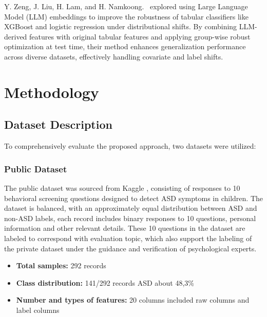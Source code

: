 \documentclass[conference]{IEEEtran}
\begin{document}
Y. Zeng, J. Liu, H. Lam, and H. Namkoong.~\cite{b7} explored using Large Language Model (LLM) embeddings to improve the robustness of tabular classifiers like XGBoost and logistic regression under distributional shifts. By combining LLM-derived features with original tabular features and applying group-wise robust optimization at test time, their method enhances generalization performance across diverse datasets, effectively handling covariate and label shifts.

\section{Methodology}
\subsection{Dataset Description}
To comprehensively evaluate the proposed approach, two datasets were utilized:

\subsubsection{Public Dataset}
The public dataset was sourced from Kaggle \cite{b18}, consisting of responses to 10 behavioral screening questions designed to detect ASD symptoms in children. The dataset is balanced, with an approximately equal distribution between ASD and non-ASD labels, each record includes binary responses to 10 questions, personal information and other relevant details. These 10 questions in the dataset are labeled to correspond with evaluation topic, which also support the labeling of the private dataset under the guidance and verification of psychological experts.
\begin{itemize}
    \item \textbf{Total samples:} 292 records
    \item \textbf{Class distribution:} 141/292 records ASD about 48,3\% 
    \item \textbf{Number and types of features:} 20 columns included raw columns and label columns
\end{itemize}
\end{document}
